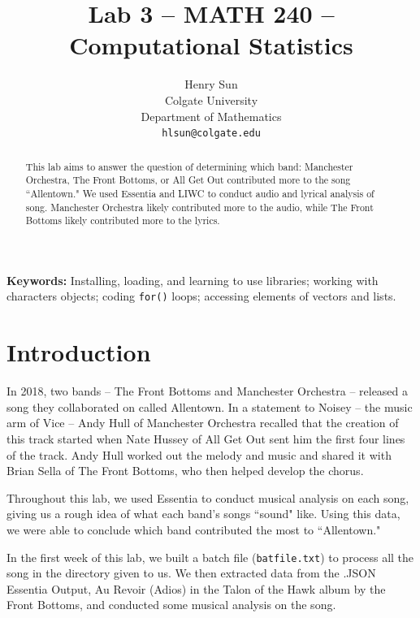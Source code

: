 \documentclass{article}\usepackage[]{graphicx}\usepackage[]{xcolor}
\begin{document}
\vspace{-1in}
\title{Lab 3 -- MATH 240 -- Computational Statistics}

\author{
  Henry Sun \\
  Colgate University  \\
  Department of Mathematics  \\
  {\tt hlsun@colgate.edu}
}

\date{}

\maketitle

\begin{multicols}{2}
\begin{abstract}
This lab aims to answer the question of determining which band: Manchester Orchestra, The Front Bottoms, or All Get Out contributed more to the song ``Allentown." We used Essentia and LIWC to conduct audio and lyrical analysis of song. Manchester Orchestra likely contributed more to the audio, while The Front Bottoms likely contributed more to the lyrics.
\end{abstract}

\noindent \textbf{Keywords:} Installing, loading, and learning to use libraries; working with characters objects; coding \texttt{for()} loops; accessing elements of vectors and lists.

\section{Introduction}
\indent  
In 2018, two bands -- The Front Bottoms and Manchester Orchestra -- released a song they collaborated on called Allentown. In a statement to Noisey \citep{vice} -- the music arm of Vice -- Andy Hull of Manchester Orchestra recalled that the creation of this track started when Nate Hussey of All Get Out sent him the first four lines of the track. Andy Hull worked out the melody and music and shared it with Brian Sella of The Front Bottoms, who then helped develop the chorus. 

\indent Throughout this lab, we used Essentia \citep{essentia} to conduct musical analysis on each song, giving us a rough idea of what each band's songs ``sound" like. Using this data, we were able to conclude which band contributed the most to ``Allentown."

\indent In the first week of this lab, we built a batch file (\texttt{batfile.txt}) to process all the song in the directory given to us. We then extracted data from the .JSON Essentia Output, Au Revoir (Adios) in the Talon of the Hawk album by the Front Bottoms, and conducted some musical analysis on the song. 


\end{multicols}
\end{document}
